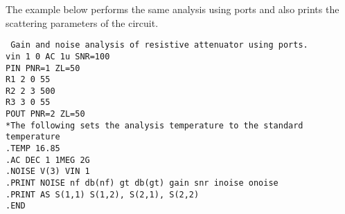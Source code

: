 \medskip

The example below performs the same analysis using ports and also prints
the scattering parameters of the circuit.

{\tt 
\noindent
Gain and noise analysis of resistive attenuator using ports.\\
vin 1 0 AC 1u SNR=100\\
PIN PNR=1 ZL=50\\
R1 2 0 55\\
R2 2 3 500\\
R3 3 0 55\\
POUT PNR=2 ZL=50\\
*The following sets the analysis temperature to the standard temperature\\
.TEMP 16.85\\
.AC DEC 1 1MEG 2G\\
.NOISE V(3) VIN 1\\
.PRINT NOISE nf db(nf) gt db(gt) gain snr inoise onoise\\
.PRINT AS S(1,1) S(1,2), S(2,1), S(2,2)\\
.END}

